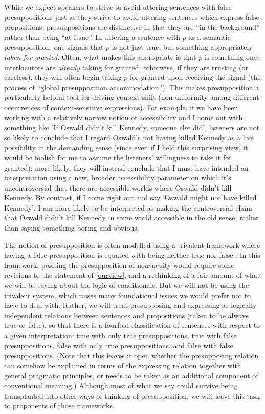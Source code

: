 \documentclass[If.tex]{subfiles}
\begin{document}
While we expect speakers to strive to avoid uttering sentences with false presuppositions just as they strive to avoid uttering sentences which express false propositions, presuppositions are distinctive in that they are “in the background” rather than being “at issue”.  In uttering a sentence with $p$ as a semantic presupposition, one signals that $p$ is not just true, but something appropriately \emph{taken for granted}.  Often, what makes this appropriate is that $p$ is something ones interlocutors are \emph{already} taking for granted; otherwise, if they are trusting (or careless), they will often begin taking $p$ for granted upon receiving the signal (the process of “global presupposition accommodation”).  This makes presupposition a particularly helpful tool for driving context-shift (non-uniformity among different occurrences of context-sensitive expressions).  For example, if we have been working with a relatively narrow notion of accessibility and I come out with something like ‘If Oswald didn't kill Kennedy, someone else did’, listeners are not so likely to conclude that I regard Oswald's not having killed Kennedy as a live possibility in the demanding sense (since even if I held this surprising view, it would be foolish for me to assume the listeners' willingness to take it for granted); more likely, they will instead conclude that I must have intended an interpretation using a new, broader accessibility parameter on which it's uncontroversial that there are accessible worlds where Oswald didn't kill Kennedy.  By contrast, if I come right out and say ‘Oswald might not have killed Kennedy’, I am more likely to be interpreted as making the controversial claim that Oswald didn't kill Kennedy in some world accessible in the old sense, rather than saying something boring and obvious. 

The notion of presupposition is often modelled using a trivalent framework where having a false presupposition is equated with being neither true nor false \citep[e.g.][]{HeimKratzerSGG}.  In this framework, positing the presupposition of nonvacuity would require some revisions to the statement of \ref{ourview}, and a rethinking of a fair amount of what we will be saying about the logic of conditionals.  But we will not be using the trivalent system, which raises many foundational issues we would prefer not to have to deal with.  Rather, we will treat presupposing and expressing as logically independent relations between sentences and propositions (taken to be always true or false), so that there is a fourfold classification of sentences with respect to a given interpretation: true with only true presuppositions, true with false presuppositions, false with only true presuppositions, and false with false presuppositions.  (Note that this leaves it open whether the presupposing relation can somehow be explained in terms of the expressing relation together with general pragmatic principles, or needs to be taken as an additional component of conventional meaning.)  Although most of what we say could survive being transplanted into other ways of thinking of presupposition, we will leave this task to proponents of those frameworks.
\end{document}
